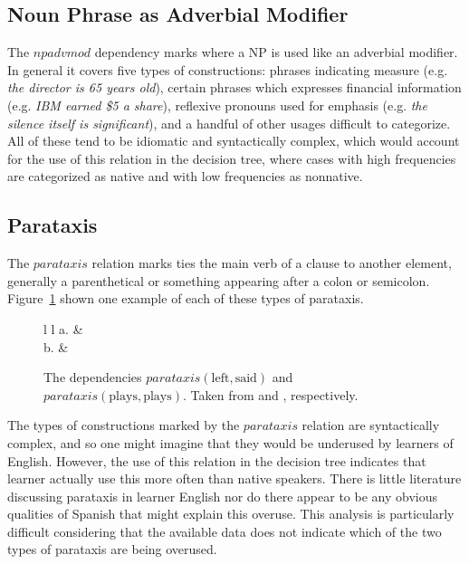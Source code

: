 \documentclass[main.tex]{subfiles}
\begin{document}
\subsection{Noun Phrase as Adverbial Modifier}

The $npadvmod$ dependency marks where a NP is used like an adverbial modifier. In general it covers five types of constructions: phrases indicating measure (e.g. \textit{the director is 65 years old}), certain phrases which expresses financial information (e.g. \textit{IBM earned \$5 a share}), reflexive pronouns used for emphasis (e.g. \textit{the silence itself is significant}), and a handful of other usages difficult to categorize. All of these tend to be idiomatic and syntactically complex, which would account for the use of this relation in the decision tree, where cases with high frequencies are categorized as native and with low frequencies as nonnative.

\subsection{Parataxis}

The $parataxis$ relation marks ties the main verb of a clause to another element, generally a parenthetical or something appearing after a colon or semicolon. Figure~\ref{fig:parataxis} shown one example of each of these types of parataxis.
\begin{figure}[htbp]
\centering
\begin{tabular}{ l l }
a. & \\
b. & \\
\end{tabular}
\caption{The dependencies $parataxis(\text{left}, \text{said})$ and $parataxis(\text{plays}, \text{plays})$. Taken from \citet{typed-deps-manual} and \citet[Ch. 13.7]{quirk:1985}, respectively.}
\label{fig:parataxis}
\end{figure}
The types of constructions marked by the $parataxis$ relation are syntactically complex, and so one might imagine that they would be underused by learners of English. However, the use of this relation in the decision tree indicates that learner actually use this more often than native speakers. There is little literature discussing parataxis in learner English nor do there appear to be any obvious qualities of Spanish that might explain this overuse. This analysis is particularly difficult considering that the available data does not indicate which of the two types of parataxis are being overused.
\end{document}
